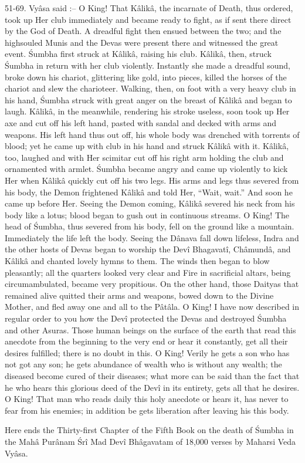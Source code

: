 51-69. Vy\^asa said :-- O King! That K\^alik\^a, the incarnate of Death, thus ordered, took up Her club immediately and became ready to fight, as if sent there direct by the God of Death. A dreadful fight then ensued between the two; and the highsouled Munis and the Devas were present there and witnessed the great event. \'Sumbha first struck at K\^alik\^a, raising his club. K\^alik\^a, then, struck \'Sumbha in return with her club violently. Instantly she made a dreadful sound, broke down his chariot, glittering like gold, into pieces, killed the horses of the chariot and slew the charioteer. Walking, then, on foot with a very heavy club in his hand, \'Sumbha struck with great anger on the breast of K\^alik\^a and began to laugh. K\^alik\^a, in the meanwhile, rendering his stroke useless, soon took up Her axe and cut off his left hand, pasted with sandal and decked with arms and weapons. His left hand thus out off, his whole body was drenched with torrents of blood; yet he came up with club in his hand and struck K\^alik\^a with it. K\^alik\^a, too, laughed and with Her scimitar cut off his right arm holding the club and ornamented with armlet. \'Sumbha became angry and came up violently to kick Her when K\^alik\^a quickly cut off his two legs. His arms and legs thus severed from his body, the Demon frightened K\^alik\^a and told Her, ``Wait, wait.'' And soon he came up before Her. Seeing the Demon coming, K\^alik\^a severed his neck from his body like a lotus; blood began to gush out in continuous streams. O King! The head of \'Sumbha, thus severed from his body, fell on the ground like a mountain. Immediately the life left the body. Seeing the D\^anava fall down lifeless, Indra and the other hosts of Devas began to worship the Dev\^i Bhagavat\^i, Ch\^amund\^a, and K\^alik\^a and chanted lovely hymns to them. The winds then began to blow pleasantly; all the quarters looked very clear and Fire in sacrificial altars, being circumambulated, became very propitious. On the other hand, those Daityas that remained alive quitted their arms and weapons, bowed down to the Divine Mother, and fled away one and all to the P\^at\^ala. O King! I have now described in regular order to you how the Dev\^i protected the Devas and destroyed \'Sumbha and other Asuras. Those human beings on the surface of the earth that read this anecdote from the beginning to the very end or hear it constantly, get all their desires fulfilled; there is no doubt in this. O King! Verily he gets a son who has not got any son; he gets abundance of wealth who is without any wealth; the diseased become cured of their diseases; what more can be said than the fact that he who hears this glorious deed of the Dev\^i in its entirety, gets all that he desires. O King! That man who reads daily this holy anecdote or hears it, has never to fear from his enemies; in addition be gets liberation after leaving his this body.

Here ends the Thirty-first Chapter of the Fifth Book on the death of \'Sumbha in the Mah\^a Pur\^anam \'Sr\^i Mad Dev\^i Bh\^agavatam of 18,000 verses by Maharsi Veda Vy\^asa.

